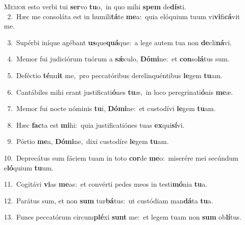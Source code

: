\lettrine{\initial\textcolor{\initialcolor}{M}}{emor} esto verbi tui \textbf{ser}\-vo \textbf{tu}\-o,~\star in quo mihi \textbf{spem} de\-\textbf{dís}\-ti.\\
{\numbfont\textcolor{\numbcolor}{~2.}}~Hæc me consoláta est in humili\-\textbf{tá}\-te \textbf{me}\-a:~\star quia elóquium tuum vi\-\textbf{vi}\-fi\-\textbf{cá}\-vit me.\par
{\numbfont\textcolor{\numbcolor}{~3.}}~Supérbi iníque agébant \textbf{us}\-que\-\textbf{quá}\-que:~\star a lege autem tua non \textbf{de}\-cli\-\textbf{ná}\-vi.\par
{\numbfont\textcolor{\numbcolor}{~4.}}~Memor fui judiciórum tuórum a \textbf{sǽ}\-culo, \textbf{Dó}\-\textbf{mi}ne:~\star et \textbf{con}\-so\-\textbf{lá}\-tus sum.\par
{\numbfont\textcolor{\numbcolor}{~5.}}~Deféctio \textbf{té}\-nu\textbf{it} me,~\star pro peccatóribus derelinquéntibus \textbf{le}\-gem \textbf{tu}\-am.\par
{\numbfont\textcolor{\numbcolor}{~6.}}~Cantábiles mihi erant justificati\-\textbf{ó}\-nes \textbf{tu}\-æ,~\star in loco peregrinati\-\textbf{ó}\-nis \textbf{me}\-æ.\par
{\numbfont\textcolor{\numbcolor}{~7.}}~Memor fui nocte nóminis \textbf{tu}\-i, \textbf{Dó}\-\textbf{mi}ne:~\star et custodívi \textbf{le}\-gem \textbf{tu}\-am.\par
{\numbfont\textcolor{\numbcolor}{~8.}}~Hæc \textbf{fac}\-ta est \textbf{mi}\-hi:~\star quia justificatiónes tuas \textbf{ex}\-qui\-\textbf{sí}\-vi.\par
{\numbfont\textcolor{\numbcolor}{~9.}}~Pórtio \textbf{me}\-a, \textbf{Dó}\-\textbf{mi}ne,~\star dixi custodíre \textbf{le}\-gem \textbf{tu}\-am.\par
{\numbfont\textcolor{\numbcolor}{10.}}~Deprecátus sum fáciem tuam in toto \textbf{cor}\-de \textbf{me}\-o:~\star miserére mei secúndum e\-\textbf{ló}\-quium \textbf{tu}\-um.\par
{\numbfont\textcolor{\numbcolor}{11.}}~Cogitávi \textbf{vi}\-as \textbf{me}\-as:~\star et convérti pedes meos in testi\-\textbf{mó}\-nia \textbf{tu}\-a.\par
{\numbfont\textcolor{\numbcolor}{12.}}~Parátus sum, et non \textbf{sum} tur\-\textbf{bá}\-tus:~\star ut custódiam man\-\textbf{dá}\-ta \textbf{tu}\-a.\par
{\numbfont\textcolor{\numbcolor}{13.}}~Funes peccatórum circum\-\textbf{plé}\-xi \textbf{sunt} me:~\star et legem tuam non \textbf{sum} ob\-\textbf{lí}\-tus.\par
